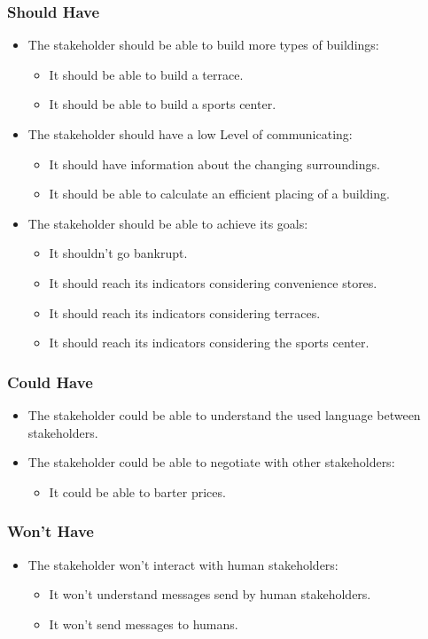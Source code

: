 \subsubsection{Should Have}
\begin{itemize}
	\item The stakeholder should be able to build more types of buildings:
	\begin{itemize}
		\item It should be able to build a terrace.
		\item It should be able to build a sports center.
	\end{itemize}
	\item The stakeholder should have a low Level of communicating:
	\begin{itemize}
		\item It should have information about the changing surroundings.
		\item It should be able to calculate an efficient placing of a building.
	\end{itemize}
	\item The stakeholder should be able to achieve its goals:
	\begin{itemize}
		\item It shouldn't go bankrupt.
		\item It should reach its indicators considering convenience stores.
		\item It should reach its indicators considering terraces.
		\item It should reach its indicators considering the sports center.
	\end{itemize}
\end{itemize}

\subsubsection{Could Have}
\begin{itemize}
	\item The stakeholder could be able to understand the used language between stakeholders.
	\item The stakeholder could be able to negotiate with other stakeholders:
	\begin{itemize}
		\item It could be able to barter prices.
	\end{itemize}
\end{itemize}

\subsubsection{Won’t Have}
\begin{itemize}
	\item The stakeholder won't interact with human stakeholders:
	\begin{itemize}
		\item It won't understand messages send by human stakeholders.
		\item It won't send messages to humans.
	\end{itemize}
\end{itemize}

